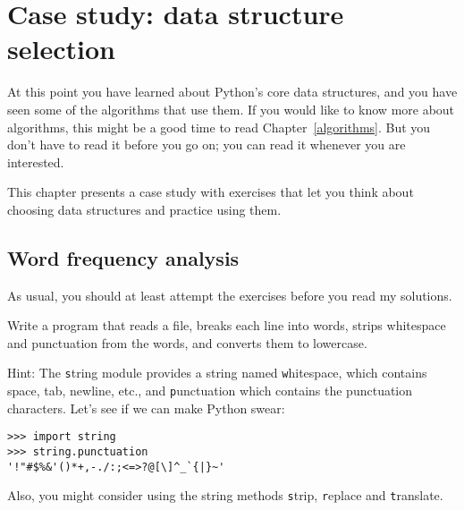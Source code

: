 \documentclass[
DIV=11,
fontsize=12,
twoside,
headinclude=false,
titlepage=firstiscover,
abstract=true,
headsepline=true,
footsepline=true,
chapterprefix=true, %
headings=big,
bibliography=totoc,%
captions=tableheading
]{scrbook}
\theoremstyle{definition}
\begin{document}
\normalfont




\chapter{Case study: data structure selection}

At this point you have learned about Python's core data structures,
and you have seen some of the algorithms that use them.
If you would like to know more about algorithms, this might be a good
time to read Chapter~\ref{algorithms}.
But you don't have to read it before you go on; you can read
it whenever you are interested.

This chapter presents a case study with exercises that let
you think about choosing data structures and practice using them.


\section{Word frequency analysis}
\label{analysis}

As usual, you should at least attempt the exercises
before you read my solutions.

\begin{exercise}
\normalfont

Write a program that reads a file, breaks each line into
words, strips whitespace and punctuation from the words, and
converts them to lowercase.

Hint: The {\texttt string} module provides a string named {\texttt whitespace},
which contains space, tab, newline, etc., and {\texttt
  punctuation} which contains the punctuation characters.  Let's see
if we can make Python swear:

\begin{lstlisting}
>>> import string
>>> string.punctuation
'!"#$%&'()*+,-./:;<=>?@[\]^_`{|}~'
\end{lstlisting}
%
Also, you might consider using the string methods {\texttt strip},
{\texttt replace} and {\texttt translate}.

\end{exercise}
\end{document}
